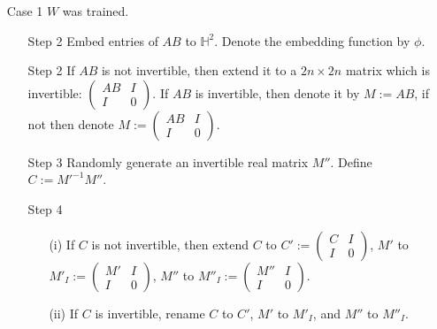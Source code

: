 \documentclass{article}
\theoremstyle{plain}
\theoremstyle{plain} %
\theoremstyle{definition}  %
\theoremstyle{remark}  %
\theoremstyle{plain}
\begin{document}
\begin{itemize}
\item[Case 1]$W$ was trained. 
\begin{itemize}
\item[Step 2] 
Embed entries of $AB$ to $\mathbb{H}^2$. Denote the embedding function by $\phi$. 
\item[Step 2] If $AB$ is not invertible, then extend it to a $2n\times 2n$ matrix which is invertible:
$\begin{pmatrix}
 AB & I\\
 I & 0
\end{pmatrix}$. If $AB$ is invertible, then denote it by $M:=AB$, if not then denote $M:=\begin{pmatrix}
 AB & I\\
 I & 0
\end{pmatrix}.$


\item[Step 3] Randomly generate an invertible real matrix $M''$. Define $C:=M'^{-1}M''$.

\item[Step 4]
\begin{itemize}
\item[(i)] If $C$ is not invertible, then extend $C$ to $C':=\begin{pmatrix}
 C & I\\
 I & 0
\end{pmatrix}$, $M'$ to $M'_I:=\begin{pmatrix}
 M '& I\\
 I & 0
\end{pmatrix}$, $M''$ to $M''_I:=\begin{pmatrix}
 M'' & I\\
 I & 0
\end{pmatrix}$.
\item[(ii)] If $C$ is invertible, rename $C$ to $C'$, $M'$ to $M'_I$, and $M''$ to $M''_I$.
\end{itemize}



\end{itemize}
\end{itemize}
\end{document}
